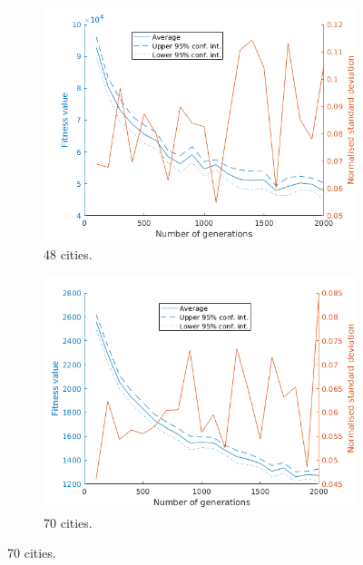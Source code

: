 \documentclass[]{article}
\begin{document}
\begin{figure}[H]
  \begin{subfigure}{0.5\textwidth}
     \centering
     \includegraphics[width=0.99\linewidth]{../GA_TSP/t248.png}
     \caption{48 cities.}
     \label{sfig:t248}
  \end{subfigure}%
  \begin{subfigure}{0.5\textwidth}
     \centering
     \includegraphics[width=0.99\linewidth]{../GA_TSP/t270.png}
     \caption{70 cities.}
     \label{sfig:t270}
  \end{subfigure}%


\end{figure}
\end{document}
